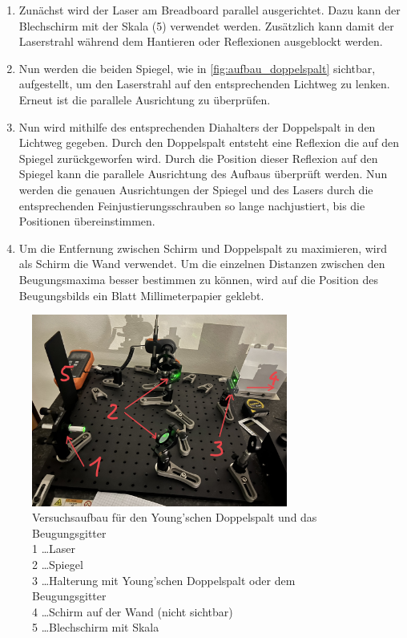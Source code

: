 \documentclass[12pt,english,ngerman]{scrartcl}
\begin{document}
\begin{enumerate}
    \item Zunächst wird der Laser am Breadboard parallel ausgerichtet. Dazu kann der Blechschirm mit der Skala (5) verwendet 
    werden. Zusätzlich kann damit der Laserstrahl während dem Hantieren oder Reflexionen ausgeblockt werden.
    \item Nun werden die beiden Spiegel, wie in \autoref{fig:aufbau_doppelspalt} sichtbar, aufgestellt, um den Laserstrahl 
    auf den entsprechenden Lichtweg zu lenken. Erneut ist die parallele Ausrichtung zu überprüfen.
    \item Nun wird mithilfe des entsprechenden Diahalters der Doppelspalt in den Lichtweg gegeben. Durch den Doppelspalt 
    entsteht eine Reflexion die auf den Spiegel zurückgeworfen wird. Durch die Position dieser Reflexion auf den Spiegel 
    kann die parallele Ausrichtung des Aufbaus überprüft werden. Nun werden die genauen Ausrichtungen der Spiegel und des 
    Lasers durch die entsprechenden Feinjustierungsschrauben so lange nachjustiert, bis die Positionen übereinstimmen.
    \item Um die Entfernung zwischen Schirm und Doppelspalt zu maximieren, wird als Schirm die Wand verwendet. Um die einzelnen 
    Distanzen zwischen den Beugungsmaxima besser bestimmen zu können, wird auf die Position des Beugungsbilds ein Blatt 
    Millimeterpapier geklebt.
\end{enumerate}

\begin{figure}[H]
	\begin{center}
		\includegraphics[width =0.75\textwidth]{./figures/aufbau_doppelspalt.jpg}
	\end{center}
	\caption[Versuchsaufbau für den Young'schen Doppelspalt und das Beugungsgitter] {
		Versuchsaufbau für den Young'schen Doppelspalt und das Beugungsgitter       \\
		1 \dots Laser                                    \\
		2 \dots Spiegel                                                      \\
		3 \dots Halterung mit Young'schen Doppelspalt oder dem Beugungsgitter                         \\
		4 \dots Schirm auf der Wand (nicht sichtbar) \\
		5 \dots Blechschirm mit Skala   
	}\label{fig:aufbau_doppelspalt}
\end{figure}
\end{document}
